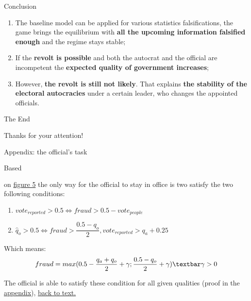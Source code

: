 \documentclass{beamer}
\begin{document}
\begin{frame}{\hypertarget{concl}{Conclusion}}
    \begin{enumerate}

        
        \item The baseline model can be applied for various statistics falsifications, the game brings the equilibrium with \textbf{all the upcoming information falsified enough} and the regime stays stable;
        
        \item If the \textbf{revolt is possible} and both the autocrat and the official are incompetent the \textbf{expected quality of government increases};
        
        \item However, \textbf{the revolt is still not likely}. That explains \textbf{the stability of the electoral autocracies }under a certain leader, who changes the appointed officials.
        

    \end{enumerate}
    
\end{frame}

\begin{frame}
\huge{\centerline{The End}}
\centerline{Thanks for your attention!}
\end{frame}

\begin{frame}{Appendix: the official's task}
    
     \hypertarget{prestext}{Based} on \hyperlink{fig4}{figure 5} the only way for the official to stay in office is two satisfy \hypertarget{officialtask}{the two following conditions:}
    \begin{enumerate}
        \item $vote_{reported} > 0.5 \Leftrightarrow fraud > 0.5 - vote_{people}$
        
        \item $\hat q_o > 0.5 \Leftrightarrow fraud > \dfrac{0.5 - q_o}{2}, vote_{reported} > q_a + 0.25$
        
    \end{enumerate}

    \noindent Which means:
    $$fraud = max(0.5 - \dfrac{q_a+q_o}{2} + \gamma; \dfrac{0.5 - q_o}{2} +\gamma) \textbar \gamma > 0$$
    
    \noindent The official is able to satisfy these condition for all given qualities (proof in the \hyperlink{app1}{appendix}), \hyperlink{sum1}{back to text.}
    
\end{frame}
\end{document}
